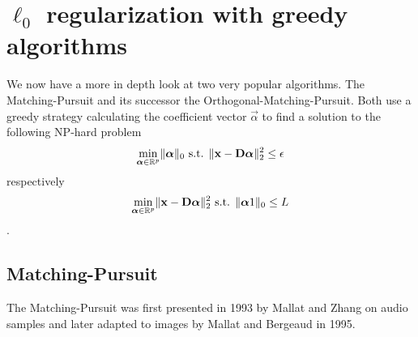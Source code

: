 


\section{$\ell_0$ regularization with greedy algorithms}
We now have a more in depth look at two very popular algorithms. 
The Matching-Pursuit and its successor the Orthogonal-Matching-Pursuit.
Both use a greedy strategy calculating the coefficient vector $\vec{\alpha}$ to
find a solution to the following NP-hard problem
\begin{equation*}
\min_{\boldsymbol{\mathrm{\alpha}}\in\mathbb{R}^{p}}   \lVert \boldsymbol{\mathrm{\alpha}} \rVert_{0}   \textrm{
s.t. }
\lVert \boldsymbol{\mathrm{x}} - \boldsymbol{\mathrm{D}}\boldsymbol{\mathrm{\alpha}} \rVert^{2}_{2} \leq \epsilon
\end{equation*}
respectively
\begin{equation*}
\min_{\boldsymbol{\mathrm{\alpha}}\in\mathbb{R}^{p}}  \lVert \boldsymbol{\mathrm{x}} - \boldsymbol{\mathrm{D}}\boldsymbol{\mathrm{\alpha}}
\rVert^{2}_{2} \textrm{ s.t.
} \lVert \boldsymbol{\mathrm{\alpha}}	1 \rVert_{0} \leq L
\end{equation*}.

\subsection{Matching-Pursuit}
\label{sec:mp}
The Matching-Pursuit was first presented in 1993 by Mallat and
Zhang\cite{Mallat1993} on audio samples and later adapted to images by Mallat
and Bergeaud in 1995\cite{Mallat1995}.

